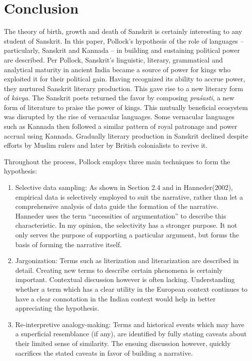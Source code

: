 \section{Conclusion}

The theory of birth, growth and death of Sanskrit is certainly interesting to any student of Sanskrit. In this paper, Pollock’s hypothesis of the role of languages – particularly, Sanskrit and Kannada – in building and sustaining political power are described. Per Pollock, Sanskrit’s linguistic, literary, grammatical and analytical maturity in ancient India became a source of power for kings who exploited it for their political gain. Having recognized its ability to accrue power, they nurtured Sanskrit literary production. This gave rise to a new literary form of {\sl kāvya}. The Sanskrit poets returned the favor by composing {\sl praśasti}, a new form of literature to praise the power of kings. This mutually beneficial ecosystem was disrupted by the rise of vernacular languages. Some vernacular languages such as Kannada then followed a similar pattern of royal patronage and power accrual using Kannada. Gradually literary production in Sanskrit declined despite efforts by Muslim rulers and later by British colonialists to revive it. 

Throughout the process, Pollock employs three main techniques to form the hypothesis: 
\begin{enumerate}
\itemsep=0pt
\item Selective data sampling: As shown in Section 2.4 and in Hanneder(2002), empirical data is selectively employed to suit the narrative, rather than let a comprehensive analysis of data guide the formation of the narrative. Hanneder uses the term “necessities of argumentation” to describe this characteristic. In my opinion, the selectivity has a stronger purpose. It not only serves the purpose of supporting a particular argument, but forms the basis of forming the narrative itself.  

\item Jargonization: Terms such as literization and literarization are described in detail.  Creating new terms to describe certain phenomena is certainly important. Contextual discussion however is often lacking. Understanding whether a term which has a clear utility in the European context continues to have a clear connotation in the Indian context would help in better appreciating the hypothesis.

\item Re-interpretive analogy-making: Terms and historical events which may have a superficial resemblance (if any), are identified by fully stating caveats about their limited sense of similarity. The ensuing discussion however, quickly sacrifices the stated caveats in favor of building a narrative.
\end{enumerate}

